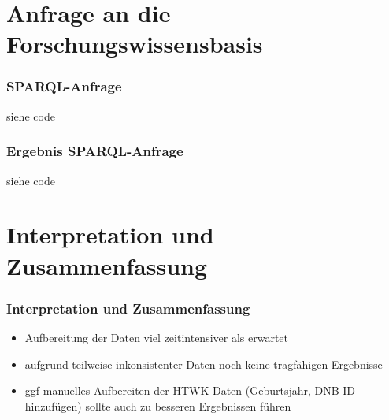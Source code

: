 \documentclass{beamer}
\begin{document}
\section{Anfrage an die Forschungswissensbasis} 
\begin{frame}\frametitle{SPARQL-Anfrage} 
siehe code
\end{frame}

\begin{frame}\frametitle{Ergebnis SPARQL-Anfrage} 
siehe code
\end{frame}

\section{Interpretation und Zusammenfassung}
\begin{frame}\frametitle{Interpretation und Zusammenfassung}
\begin{itemize}
\item Aufbereitung der Daten viel zeitintensiver als erwartet
\item aufgrund teilweise inkonsistenter Daten noch keine tragfähigen Ergebnisse
\item ggf manuelles Aufbereiten der HTWK-Daten (Geburtsjahr, DNB-ID hinzufügen) sollte auch zu besseren Ergebnissen führen
\end{itemize}
\end{frame}
\end{document}
